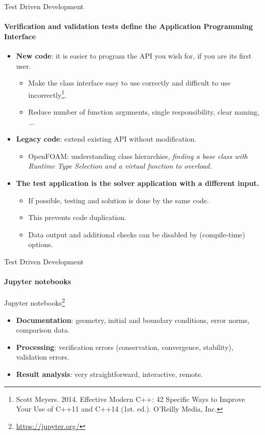 \documentclass[
	aspectratio=169,%
	color={accentcolor=2d},
	logo=true,%
	colorframetitle=true,%
	]{tudabeamer}
\begin{document}
\begin{frame}{Test Driven Development} 
    \framesubtitle{Verification and validation tests define the Application Programming Interface}
        \vfill

    \begin{itemize}
        \item \textbf{New code}: it is easier to program the API you wish for, if you are its first user. 
            \begin{itemize}
                \item Make the class interface easy to use correctly and difficult to use incorrectly\footnote{Scott Meyers. 2014. Effective Modern C++: 42 Specific Ways to Improve Your Use of C++11 and C++14 (1st. ed.). O'Reilly Media, Inc.}.
                \item Reduce number of function arguments, single responsibility, clear naming, ... 
            \end{itemize}
        \item \textbf{Legacy code}: extend existing API without modification. 
            \begin{itemize}
                \item OpenFOAM: understanding class hierarchies, \textit{finding a base class with Runtime Type Selection and a virtual function to overload.}
            \end{itemize}
        \item \textbf{The test application is the solver application with a different input.}
            \begin{itemize}
                \item If possible, testing and solution is done by the same code.  
                \item This prevents code duplication. 
                \item Data output and additional checks can be disabled by (compile-time) options.
            \end{itemize}
    \end{itemize}

\end{frame}


\begin{frame}{Test Driven Development} 
    \framesubtitle{Jupyter notebooks}

    \vfill
    Jupyter notebooks\footnote{\href{https://jupyter.org/}{https://jupyter.org/}}
    \begin{itemize}
        \item \textbf{Documentation}: geometry, initial and boundary conditions, error norms, comparison data.
        \item \textbf{Processing}: verification errors (conservation, convergence, stability), validation errors. 
        \item \textbf{Result analysis}: very straightforward, interactive, remote.
    \end{itemize}
\end{frame}
\end{document}
